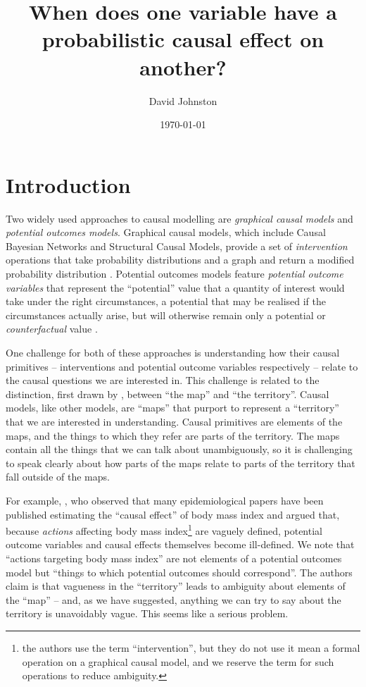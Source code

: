\documentclass{article}
\title{When does one variable have a probabilistic causal effect on another?}
\date{\today}
\author{ David Johnston }
\theoremstyle{plain}
\theoremstyle{definition}
\begin{document}
\maketitle


\tableofcontents


\section{Introduction}

Two widely used approaches to causal modelling are \emph{graphical causal models} and \emph{potential outcomes models}. Graphical causal models, which include Causal Bayesian Networks and Structural Causal Models, provide a set of \emph{intervention} operations that take probability distributions and a graph and return a modified probability distribution \citep{pearl_causality:_2009}. Potential outcomes models feature \emph{potential outcome variables} that represent the ``potential'' value that a quantity of interest would take under the right circumstances, a potential that may be realised if the circumstances actually arise, but will otherwise remain only a potential or \emph{counterfactual} value \citep{rubin_causal_2005}.

One challenge for both of these approaches is understanding how their causal primitives -- interventions and potential outcome variables respectively -- relate to the causal questions we are interested in. This challenge is related to the distinction, first drawn by \citep{korzybski_science_1933}, between ``the map'' and ``the territory''. Causal models, like other models, are ``maps'' that purport to represent a ``territory'' that we are interested in understanding. Causal primitives are elements of the maps, and the things to which they refer are parts of the territory. The maps contain all the things that we can talk about unambiguously, so it is challenging to speak clearly about how parts of the maps relate to parts of the territory that fall outside of the maps.

For example, \citet{hernan_does_2008}, who observed that many epidemiological papers have been published estimating the ``causal effect'' of body mass index and argued that, because \emph{actions} affecting body mass index\footnote{the authors use the term ``intervention'', but they do not use it mean a formal operation on a graphical causal model, and we reserve the term for such operations to reduce ambiguity.} are vaguely defined, potential outcome variables and causal effects themselves become ill-defined. We note that ``actions targeting body mass index'' are not elements of a potential outcomes model but ``things to which potential outcomes should correspond''. The authors claim is that vagueness in the ``territory'' leads to ambiguity about elements of the ``map'' -- and, as we have suggested, anything we can try to say about the territory is unavoidably vague. This seems like a serious problem.
\end{document}
